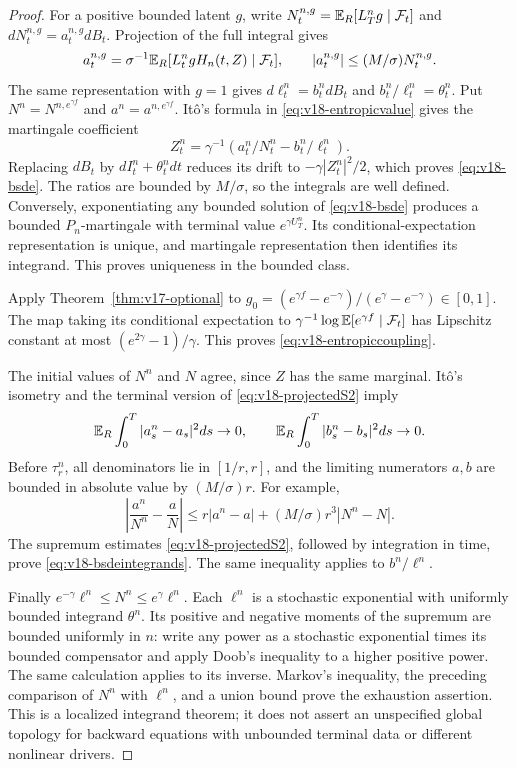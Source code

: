 \begin{proof}
For a positive bounded latent $g$, write
$N_t^{n,g}=\mathbb E_R[L_T^ng\mid\mathcal F_t]$ and
$dN_t^{n,g}=a_t^{n,g}dB_t$. Projection of the full integral gives
\[
 a_t^{n,g}=\sigma^{-1}\mathbb E_R[L_t^ngH_n(t,Z)\mid\mathcal F_t],
 \qquad |a_t^{n,g}|\le(M/\sigma)N_t^{n,g}.
\]
The same representation with $g=1$ gives $d\ell_t^n=b_t^n dB_t$ and
$b_t^n/\ell_t^n=\theta_t^n$. Put $N^n=N^{n,e^{\gamma f}}$ and
$a^n=a^{n,e^{\gamma f}}$. It\^o's formula in
\eqref{eq:v18-entropicvalue} gives the martingale coefficient
\[
 Z_t^n=\gamma^{-1}\left(a_t^n/N_t^n-b_t^n/\ell_t^n\right).
\]
Replacing $dB_t$ by $dI_t^n+\theta_t^n dt$ reduces its drift to
$-\gamma|Z_t^n|^2/2$, which proves \eqref{eq:v18-bsde}. The ratios
are bounded by $M/\sigma$, so the integrals are well defined. Conversely,
exponentiating any bounded solution of \eqref{eq:v18-bsde} produces a
bounded $P_n$-martingale with terminal value $e^{\gamma U_T^n}$.
Its conditional-expectation representation is unique, and martingale
representation then identifies its integrand. This proves uniqueness in
the bounded class.

Apply Theorem~\ref{thm:v17-optional} to
$g_0=(e^{\gamma f}-e^{-\gamma})/(e^\gamma-e^{-\gamma})\in[0,1]$.
The map taking its conditional expectation to
$\gamma^{-1}\log\mathbb E[e^{\gamma f}\mid\mathcal F_t]$ has Lipschitz constant
at most $(e^{2\gamma}-1)/\gamma$. This proves
\eqref{eq:v18-entropiccoupling}.

The initial values of $N^n$ and $N$ agree, since $Z$ has the same
marginal. It\^o's isometry and the terminal version of
\eqref{eq:v18-projectedS2} imply
\[
 \mathbb E_R\int_0^T|a_s^n-a_s|^2ds\to0,
 \qquad \mathbb E_R\int_0^T|b_s^n-b_s|^2ds\to0.
\]
Before $\tau_r^n$, all denominators lie in $[1/r,r]$, and the limiting
numerators $a,b$ are bounded in absolute value by $(M/\sigma)r$.
For example,
\[
 \left|\frac{a^n}{N^n}-\frac aN\right|
 \le r|a^n-a|+(M/\sigma)r^3|N^n-N|.
\]
The supremum estimates \eqref{eq:v18-projectedS2}, followed by integration
in time, prove \eqref{eq:v18-bsdeintegrands}. The same inequality applies
to $b^n/\ell^n$.

Finally $e^{-\gamma}\ell^n\le N^n\le e^\gamma\ell^n$. Each $\ell^n$
is a stochastic exponential with uniformly bounded integrand
$\theta^n$. Its positive and negative moments of the supremum are
bounded uniformly in $n$: write any power as a stochastic exponential
times its bounded compensator and apply Doob's inequality to a higher
positive power. The same calculation applies to its inverse. Markov's
inequality, the preceding comparison of $N^n$ with $\ell^n$, and a union
bound prove the exhaustion assertion. This is a localized integrand
theorem; it does not assert an unspecified global topology for backward
equations with unbounded terminal data or different nonlinear drivers.
\end{proof}

